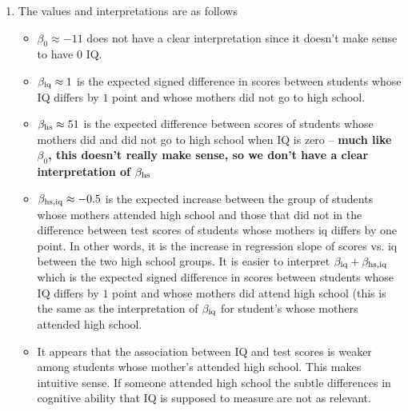 \begin{example}
\begin{enumerate}[label=(\alph*)]
\item The values and interpretations are as follows
\begin{itemize}
\item $\beta_0 \approx -11$ does not have a clear interpretation since it doesn't make sense to have $0$ IQ. 
\item $\beta_{\rm iq}\approx 1$ is the expected signed difference in scores between students whose IQ differs by $1$ point and whose mothers did not go to high school. 
\item $\beta_{\rm hs} \approx 51$ is the expected difference between scores of students whose mothers did and did not go to high school when IQ is zero -- {\bf much like $\beta_0$, this doesn't really make sense, so we don't have a clear interpretation of $\beta_{\rm hs}$}
\item $\beta_{\rm hs,iq}\approx -0.5$ is the expected increase between the group of students whose mothers attended high school and those that did not in the difference between test scores of students whose mothers iq differs by one point. In other words, it is the increase in regression slope of scores vs. iq between the two high school groups. It is easier to interpret $\beta_{\rm iq}  + \beta_{\rm hs,iq}$ which is the expected signed difference in scores between students whose IQ differs by $1$ point and whose mothers did attend high school (this is the same as the interpretation of $\beta_{\rm iq}$ for student's whose mothers attended high school. 
\item It appears that the association between IQ and test scores is weaker among students whose mother's attended high school. This makes intuitive sense. If someone attended high school the subtle differences in cognitive ability that IQ is supposed to measure are not as relevant. 
\end{itemize}
\end{enumerate}



\end{example}

